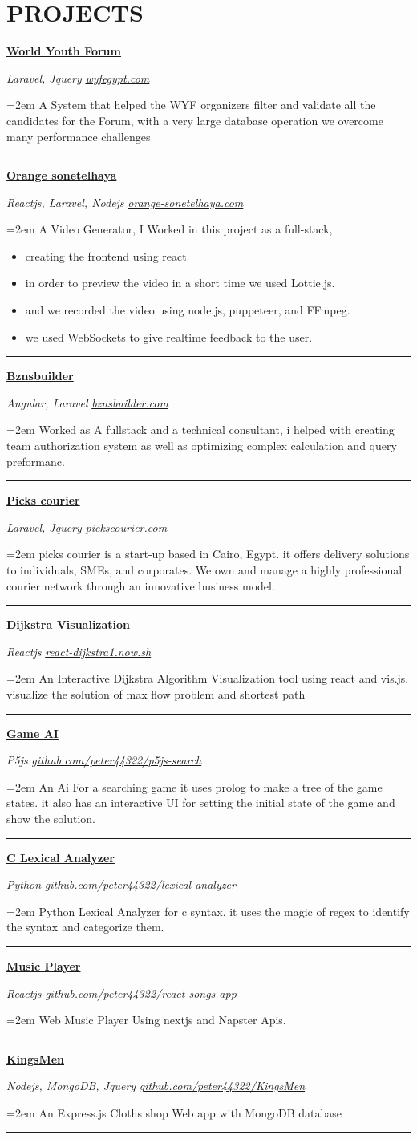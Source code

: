 \documentclass[paper=a4,fontsize=11pt]{scrartcl} %
\newcommand{\sepspace}{\vspace*{1em}}		%
\newcommand{\NewPart}[1]{\section*{\uppercase{#1}}}
\newcommand{\ProjectEntry}[4]{
		\noindent \textbf{\href{https://#2}{#1}} \hfill \par
		 \noindent  \textit{#4}  \hfill    
        \small{\itshape\href{https://#2}{#2}} \par  %
		\noindent\hangindent=2em\hangafter=0 \small #3 %
		\normalsize 
		\sepspace
		\par\noindent\textcolor{gray}{\rule{\textwidth}{0.2pt}}
		}
\begin{document}
\NewPart{projects}{
\ProjectEntry{World Youth Forum}{wyfegypt.com}{A System that helped the WYF organizers filter and validate all the candidates for the Forum, with a very large database operation we overcome many performance challenges}{Laravel, Jquery}

\ProjectEntry{Orange sonetelhaya}{orange-sonetelhaya.com}{A Video Generator, I Worked in this project as a full-stack, 
\begin{itemize}
 \item creating the frontend using react
 \item in order to preview the video in a short time we used Lottie.js.
 \item and we recorded the video using node.js, puppeteer, and FFmpeg.
 \item we used WebSockets to give realtime feedback to the user.
\end{itemize}
}{Reactjs, Laravel, Nodejs}

\ProjectEntry{Bznsbuilder}{bznsbuilder.com}{Worked as A fullstack and a technical consultant, i helped with creating team authorization system as well as optimizing complex calculation and query preformanc.}{Angular, Laravel}

\ProjectEntry{Picks courier}{pickscourier.com}{
picks courier is a start-up based in Cairo, Egypt. it offers delivery solutions to individuals, SMEs, and corporates. We own and manage a highly professional courier network through an innovative business model.}{Laravel, Jquery}


\ProjectEntry{Dijkstra Visualization}{react-dijkstra1.now.sh}{
An Interactive Dijkstra Algorithm Visualization tool using react and vis.js. visualize the solution of max flow problem and shortest path
}{Reactjs}



\ProjectEntry{Game AI}{github.com/peter44322/p5js-search}{An Ai For a searching game it uses prolog to make a tree of the game states. it also has an interactive UI for setting the initial state of the game and show the solution.}{P5js}

\ProjectEntry{C Lexical Analyzer}{github.com/peter44322/lexical-analyzer}{
Python Lexical Analyzer for c syntax. it uses the magic of regex to identify the syntax and categorize them.
}{Python}


\ProjectEntry{Music Player}{github.com/peter44322/react-songs-app}{
Web Music Player Using nextjs and Napster Apis.
}{Reactjs}

\ProjectEntry{KingsMen}{github.com/peter44322/KingsMen}{
An Express.js Cloths shop Web app with MongoDB database
}{Nodejs, MongoDB, Jquery}

}
\end{document}
